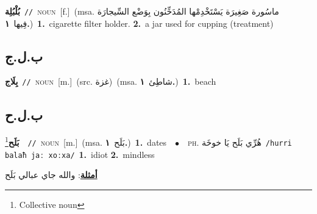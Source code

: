 \documentclass[10pt,a4paper,twoside]{article} %
\begin{document}
\begin{multicols}{2}
{\setlength\topsep{0pt}\textbf{\foreignlanguage{arabic}{بُلْبُلِة}}\ {\color{gray}\texttt{//}\color{black}}\ \textsc{noun}\ [f.]\ \color{gray}(msa. \foreignlanguage{arabic}{ماسُورة صَغِيرَة يَسْتَخْدِمْها المُدَخِّنُون بِوَضْع السِّيجارَة فِيها}~\foreignlanguage{arabic}{\textbf{١.}})\color{black}\ \textbf{1.}~cigarette filter holder.  \textbf{2.}~a jar used for cupping (treatment)\ } \vspace{2mm}

\vspace{-3mm}
\subsection*{\color{blue}\foreignlanguage{arabic}{ب.ل.ج}\color{blue}{ (ntws)}} 

{\setlength\topsep{0pt}\textbf{\foreignlanguage{arabic}{بِلَاج}}\ {\color{gray}\texttt{//}\color{black}}\ \textsc{noun}\ [m.]\ (src. \color{gray}\foreignlanguage{arabic}{غزة}\color{black})\ \color{gray}(msa. \foreignlanguage{arabic}{شاطِئ}~\foreignlanguage{arabic}{\textbf{١.}})\color{black}\ \textbf{1.}~beach\ } \vspace{2mm}

\vspace{-3mm}
\subsection*{\color{blue}\foreignlanguage{arabic}{ب.ل.ح}\color{blue}{}} 

{\setlength\topsep{0pt}\textbf{\foreignlanguage{arabic}{بَلَح}}\footnote{Collective noun}\ \ {\color{gray}\texttt{//}\color{black}}\ \textsc{noun}\ [m.]\ \color{gray}(msa. \foreignlanguage{arabic}{بَلَح}~\foreignlanguage{arabic}{\textbf{١.}})\color{black}\ \textbf{1.}~dates\ \ $\bullet$\ \ \textsc{ph.} \color{gray} \foreignlanguage{arabic}{هُرِّي بَلَح يَا خوخَة}\color{black}\ {\color{gray}\texttt{/{\sffamily hurri balaħ jaː xoːxa}/}\color{black}}\ \textbf{1.}~idiot  \textbf{2.}~mindless\  \begin{flushright}\color{gray}\foreignlanguage{arabic}{\textbf{\underline{\foreignlanguage{arabic}{أمثلة}}}: والله جاي عبالي بَلَح}\end{flushright}\color{black}} \vspace{2mm}


\end{multicols}
\end{document}
